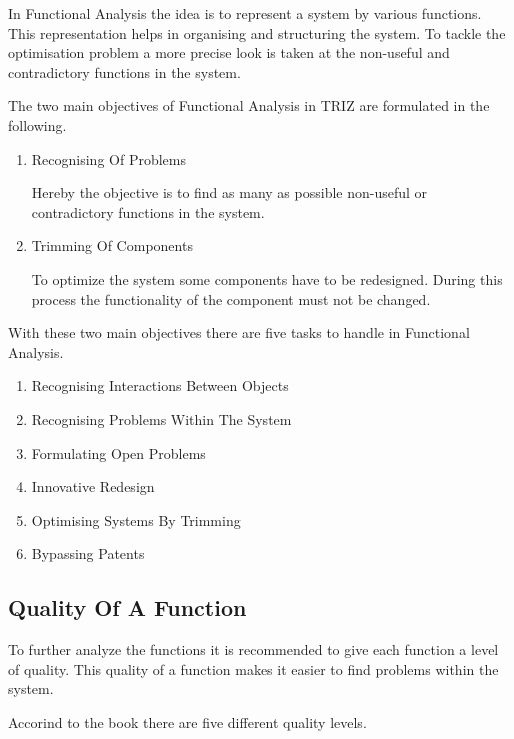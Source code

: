 \documentclass[11pt,a4paper]{article}
\begin{document}
In Functional Analysis the idea is to represent a system by various functions.
This representation helps in organising and structuring the system.  To tackle
the optimisation problem a more precise look is taken at the non-useful and
contradictory functions in the system.

The two main objectives of Functional Analysis in TRIZ are formulated in the
following.

\begin{enumerate}
\item Recognising Of Problems
  
  Hereby the objective is to find as many as possible non-useful or
  contradictory functions in the system.
\item Trimming Of Components
  
  To optimize the system some components have to be redesigned.  During this
  process the functionality of the component must not be changed.
\end{enumerate}

With these two main objectives there are five tasks to handle in Functional
Analysis.

\begin{enumerate}
\item Recognising Interactions Between Objects
\item Recognising Problems Within The System
\item Formulating Open Problems
\item Innovative Redesign
\item Optimising Systems By Trimming
\item Bypassing Patents
\end{enumerate}

\subsection{Quality Of A Function}

To further analyze the functions it is recommended to give each function a
level of quality.  This quality of a function makes it easier to find problems
within the system.

Accorind to the book there are five different quality levels.
\end{document}
